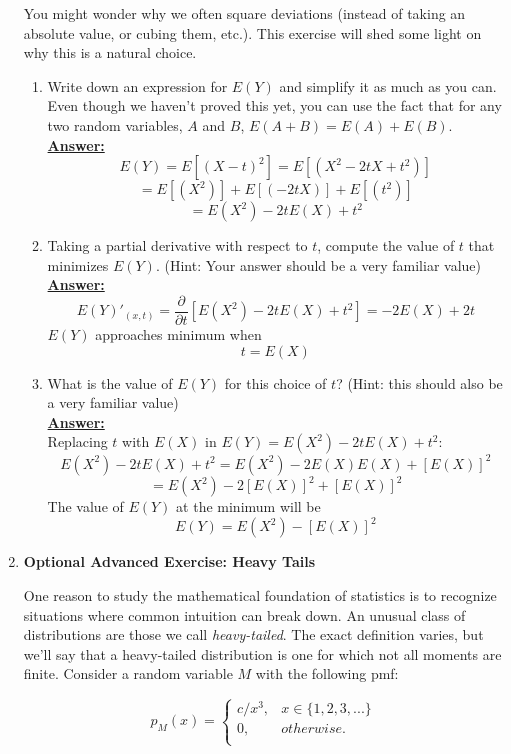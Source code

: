\documentclass[12pt,a4paper]{article}
\numberwithin{equation}{subsection}
\begin{document}
\begin{enumerate}
You might wonder why we often square deviations (instead of taking an absolute value, or cubing them, etc.).  This exercise will shed some light on why this is a natural choice.

\begin{enumerate}
\item Write down an expression for $E(Y)$ and simplify it as much as you can.  Even though we haven't proved this yet, you can use the fact that for any two random variables, $A$ and $B$, $E(A + B) = E(A) + E(B)$.
\\
\textbf{\underline{Answer:}}
$$E(Y) = E[(X - t)^2] = E[(X^2 -2tX + t^2)]$$
$$= E[(X^2)] + E[(-2tX)] + E[(t^2)]$$
$$= E(X^2) - 2tE(X) + t^2$$
\item Taking a partial derivative with respect to $t$, compute the value of $t$ that minimizes $E(Y)$.  (Hint: Your answer should be a very familiar value)
\\
\newpage
\textbf{\underline{Answer:}}
$$E(Y)'_{(x, t)} = \frac{\partial }{\partial t} [E(X^2) - 2tE(X) + t^2] = - 2E(X) + 2t$$
$E(Y)$ approaches minimum when
$$t = E(X)$$
\item What is the value of $E(Y)$ for this choice of $t$?
(Hint: this should also be a very familiar value)
\\
\textbf{\underline{Answer:}}
\\
Replacing $t$ with $E(X)$ in $E(Y) = E(X^2) - 2tE(X) + t^2$:
$$E(X^2) - 2tE(X) + t^2 = E(X^2) - 2E(X)E(X) + [E(X)]^2$$
$$ = E(X^2) - 2[E(X)]^2 + [E(X)]^2$$
The value of $E(Y)$ at the minimum will be 
$$E(Y) = E(X^2) - [E(X)]^2$$

\end{enumerate}

\item \textbf{Optional Advanced Exercise: Heavy Tails}

One reason to study the mathematical foundation of statistics is to recognize situations where common intuition can break down.  An unusual class of distributions are those we call \textit{heavy-tailed}.  The exact definition varies, but we'll say that a heavy-tailed distribution is one for which not all moments are finite.  Consider a random variable $M$ with the following pmf:

$$p_M(x) = \begin{cases}
c/x^3, &x \in \{1,2,3,...\}\\
0, &otherwise.\\
\end{cases}
$$


\end{enumerate}
\end{document}
